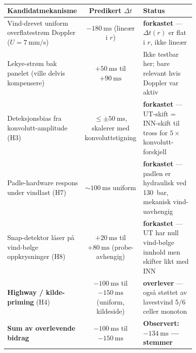 \begin{table}[hbt]
  \centering
  \small
  \caption[$\Delta t$-regnskap, kanonisk celle]{
  }
  \label{tab:ch04_dt_budget_canonical}
  \begin{tabular}{p{0.42\linewidth} c p{0.35\linewidth}}
    \toprule
    Kandidatmekanisme &
      Predikert $\Delta t$ &
      Status \\
    \midrule
    Vind-drevet uniform overflate\-strøm Doppler
      ($U = \qty{7}{\milli\metre\per\second}$) &
      $-\qty{180}{\milli\second}$ (lineær i $r$) &
      \textbf{forkastet} — $\Delta t(r)$ er flat i $r$, ikke lineær \\[0.4em]

    Lekye-strøm bak panelet (ville delvis kompensere) &
      $+\qty{50}{\milli\second}$ til $+\qty{90}{\milli\second}$ &
      Ikke testbar her; bare relevant hvis Doppler var aktiv \\[0.4em]

    Deteksjons\-bias fra konvolutt-amplitude (H3) &
      $\leq \pm \qty{50}{\milli\second}$,
        skalerer med konvolutt\-stigning &
      \textbf{forkastet} — UT-skift = INN-skift til tross for
        $5\times$ konvolutt-forskjell \\[0.4em]

    Padle-hardware respons under vindlast (H7) &
      $\sim \qty{100}{\milli\second}$ uniform &
      \textbf{forkastet} — padlen er hydraulisk ved \qty{130}{bar},
        mekanisk vind-uavhengig \\[0.4em]

    Snap-detektor låser på vind-bølge oppkrysninger (H8) &
      $+\qty{20}{\milli\second}$ til $+\qty{80}{\milli\second}$
        (probe-avhengig) &
      \textbf{forkastet} — UT har null vind-bølge innhold men
        skifter likt med INN \\[0.4em]

    \textbf{Highway / kilde-priming} (H4) &
      $-\qty{100}{\milli\second}$ til $-\qty{150}{\milli\second}$
        (uniform, kilde\-side) &
      \textbf{overlever} — også støttet av lavestvind 5/6 celler
        monoton \\
    \midrule
    \textbf{Sum av overlevende bidrag} &
      $-\qty{100}{\milli\second}$ til $-\qty{150}{\milli\second}$ &
      \textbf{Observert: $-\qty{134}{\milli\second}$ — stemmer} \\
    \bottomrule
  \end{tabular}
\end{table}
